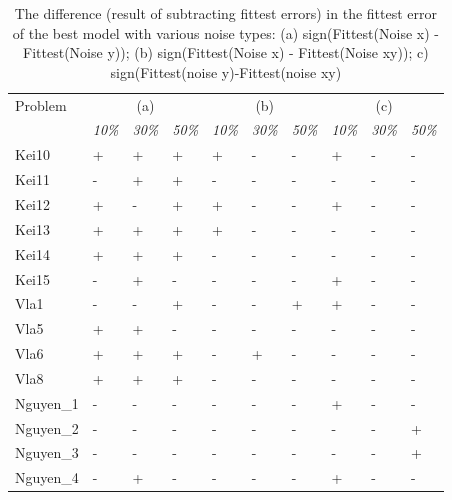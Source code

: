 \begin{table}
\caption{The difference (result of subtracting fittest errors) in the fittest error of the best model with various noise types: (a) sign(Fittest(Noise x) - Fittest(Noise y)); (b) sign(Fittest(Noise x) - Fittest(Noise xy)); c) sign(Fittest(noise y)-Fittest(noise xy)}
\label{tab:difFittest}       %
\begin{tabular}{l|lll|lll|lll}
\hline\noalign{\smallskip}
Problem & \multicolumn{3}{c|}{(a)} & \multicolumn{3}{c|}{(b)} & \multicolumn{3}{c}{(c)} \\
 & \multicolumn{1}{c}{\textit{10\%}} & \multicolumn{1}{c}{\textit{30\%}} & \multicolumn{1}{c|}{\textit{50\%}} & \multicolumn{1}{c}{\textit{10\%}} & \multicolumn{1}{c}{\textit{30\%}} & \multicolumn{1}{c|}{\textit{50\%}} & \multicolumn{1}{c}{\textit{10\%}} & \multicolumn{1}{c}{\textit{30\%}} & \multicolumn{1}{c}{\textit{50\%}} \\
\hline
Kei10 & + & + & + & + & - & - & + & - & - \\
Kei11 & - & + & + & - & - & - & - & - & - \\
Kei12 & + & - & + & + & - & - & + & - & - \\
Kei13 & + & + & + & + & - & - & - & - & - \\
Kei14 & + & + & + & - & - & - & - & - & - \\
Kei15 & - & + & - & - & - & - & + & - & - \\
Vla1 & - & - & + & - & - & + & + & - & - \\
Vla5 & + & + & - & - & - & - & - & - & - \\
Vla6 & + & + & + & - & + & - & - & - & - \\
Vla8 & + & + & + & - & - & - & - & - & - \\
Nguyen\_1 & - & - & - & - & - & - & + & - & - \\
Nguyen\_2 & - & - & - & - & - & - & - & - & + \\
Nguyen\_3 & - & - & - & - & - & - & - & - & + \\
Nguyen\_4 & - & + & - & - & - & - & + & - & - \\
\hline
\end{tabular}
\end{table}
